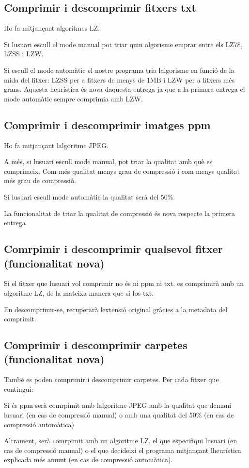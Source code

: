 \subsection*{Comprimir i descomprimir fitxers txt}

Ho fa mitjançant algoritmes LZ.

Si l\textquotesingle{}usuari escull el mode manual pot triar quin algorisme emprar entre els L\+Z78, L\+Z\+SS i L\+ZW.

Si escull el mode automàtic el nostre programa tria l\textquotesingle{}algorisme en funció de la mida del fitxer\+: L\+Z\+SS per a fitxers de menys de 1\+MB i L\+ZW per a fitxers més grans. Aquesta heurística és nova d\textquotesingle{}aquesta entrega ja que a la primera entrega el mode automàtic sempre comprimia amb L\+ZW.

\subsection*{Comprimir i descomprimir imatges ppm}

Ho fa mitjançant l\textquotesingle{}algoritme J\+P\+EG.

A més, si l\textquotesingle{}usuari escull mode manual, pot triar la qualitat amb què es comprimeix. Com més qualitat menys grau de compressió i com menys qualitat més grau de compressió.

Si l\textquotesingle{}usuari escull mode automàtic la qualitat serà del 50\%.

La funcionalitat de triar la qualitat de compressió és nova respecte la primera entrega

\subsection*{Comrpimir i descomprimir qualsevol fitxer (funcionalitat nova)}

Si el fitxer que l\textquotesingle{}usuari vol comprimir no és ni ppm ni txt, es comprimirà amb un algoritme LZ, de la mateixa manera que si fos txt.

En descomprimir-\/se, recuperarà l\textquotesingle{}extensió original gràcies a la metadata del comprimit.

\subsection*{Comprimir i descomprimir carpetes (funcionalitat nova)}

També es poden comprimir i descomprimir carpetes. Per cada fitxer que contingui\+:
\begin{DoxyItemize}
\item Si és ppm serà comrpimit amb l\textquotesingle{}algoritme J\+P\+EG amb la qualitat que demani l\textquotesingle{}usuari (en cas de compressió manual) o amb una qualitat del 50\% (en cas de compressió automàtica)
\item Altrament, serà comrpimit amb un algoritme LZ, el que especifiqui l\textquotesingle{}usuari (en cas de compressió manual) o el que decideixi el programa mitjançant l\textquotesingle{}heurística explicada més amunt (en cas de compressió automàtica).
\end{DoxyItemize}

